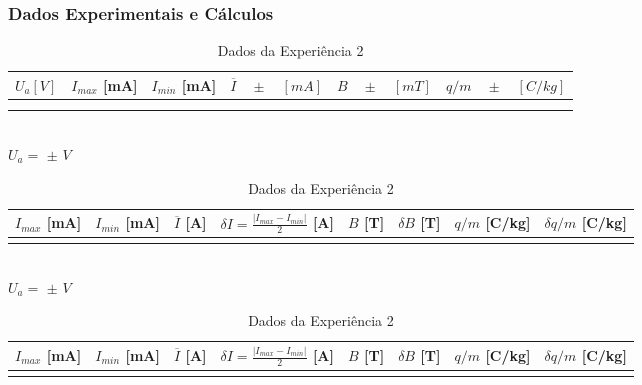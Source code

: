 \documentclass[a4paper,12pt]{article}  %
\begin{document}
\subsubsection{\sf Dados Experimentais e Cálculos}

\begin{table}[!hbp]
	\centering
	\begin{tabular}{|c|c|c|c|c|c|}
	\hline
	 $U_a [V]$ & $I_{max}$ [mA] & $I_{min}$ [mA] & $\overline{I} \quad \pm \quad[mA]$ & $B \quad \pm \quad [mT]$   & $q/m \quad \pm \quad [C/kg] $ \\
	\hline
	 & &  &  & &   \\
 	\hline
 	 & &  &  & &   \\
	 \hline
	 
 	\end{tabular}\\[10pt]
	\noindent	$U_a =$ \underline{\makebox[1.5cm][r]{~}} $\pm$ \underline{\makebox[1cm][r]{~}} $V$ \\
	\begin{tabular}{|c|c|c|c|c|c|c|c|}
	\hline
	 $I_{max}$ [mA] & $I_{min}$ [mA] & $\overline{I}$ [A]	& $\delta I = \frac{| I_{max} - I_{min}|}{2}$ [A] & $B$ [T] & $\delta B$  [T] & $q/m$ [C/kg] & $\delta q/m$ [C/kg] \\
	\hline
	 &  &  & &  &  & & \\
	 \hline
 	\end{tabular}\\[10pt]
	\noindent	$U_a =$ \underline{\makebox[1.5cm][r]{~}} $\pm$ \underline{\makebox[1cm][r]{~}} $V$ \\
	\begin{tabular}{|c|c|c|c|c|c|c|c|}
	\hline
	 $I_{max}$ [mA] & $I_{min}$ [mA] & $\overline{I}$ [A]	& $\delta I = \frac{| I_{max} - I_{min}|}{2}$ [A] & $B$ [T] & $\delta B$  [T] & $q/m$ [C/kg] & $\delta q/m$ [C/kg] \\
	\hline
	 &  &  & &  &  & & \\
	 \hline
 	\end{tabular}
	
	\caption{Dados da Experiência 2} 
	\label{tab:Dados2}
\end{table}
\end{document}
